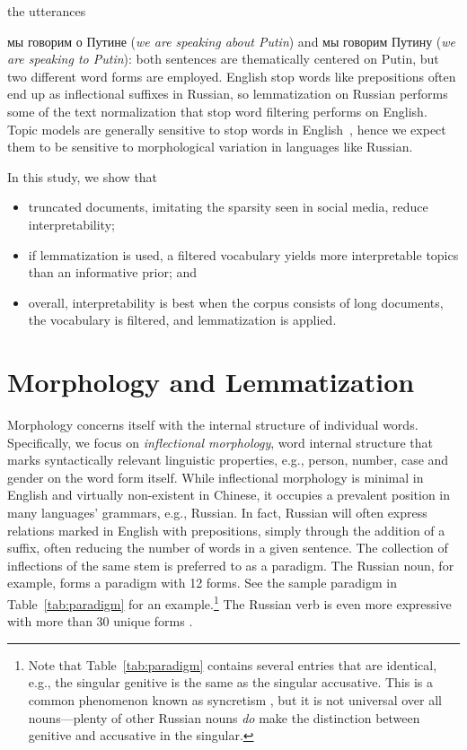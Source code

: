 \documentclass{clv2}
\begin{document}
the utterances {{мы говорим о Путине} ({\em we
    are speaking about Putin}) and {{мы
      говорим Путину} ({\em we are speaking to Putin})}: both sentences
  are thematically centered on Putin, but two different word forms
  are employed.
English stop words like prepositions often end up as inflectional
suffixes in Russian, so lemmatization on Russian performs some
of the text normalization that stop word filtering performs on English.
Topic models are generally sensitive to stop
words in English~\cite{wallach2009,blei2010,eisenstein2011}, hence we
expect them to be sensitive to morphological variation in languages
like Russian.

In this study, we show that
\begin{itemize}
    \item truncated documents, imitating the sparsity seen in social
        media, reduce interpretability;
    \item if lemmatization is used, a filtered vocabulary yields more
        interpretable topics than an informative prior; and
    \item overall, interpretability is best when the corpus consists
        of long documents, the vocabulary is filtered, and lemmatization
        is applied.
\end{itemize}


\section{Morphology and Lemmatization}\label{sec:inflectional}

Morphology concerns itself with the internal structure of individual
words.  Specifically, we focus on {\em inflectional morphology}, word
internal structure that marks syntactically relevant linguistic
properties, e.g., person, number, case and gender on the word form
itself. While inflectional morphology is minimal in English and
virtually non-existent in Chinese, it occupies a prevalent position in
many languages' grammars, e.g., Russian. In fact, Russian will often
express relations marked in English with prepositions, simply through
the addition of a suffix, often reducing the number of words in a
given sentence. The collection of inflections of the same stem is preferred to as a
paradigm.  The Russian noun, for example, forms a paradigm with 12
forms.  See the sample paradigm in Table~\ref{tab:paradigm} for an
example.\footnote{Note that Table~\ref{tab:paradigm} contains several
  entries that are identical, e.g., the singular genitive is the same
  as the singular accusative. This is a common phenomenon known as
  syncretism \cite{baerman2005syntax}, but it is not universal over all nouns---plenty of other
  Russian nouns {\em do} make the distinction between
  genitive and accusative in the singular.} The Russian verb is even more expressive with more
than 30 unique forms \cite{wade2010comprehensive}.

}
\end{document}
